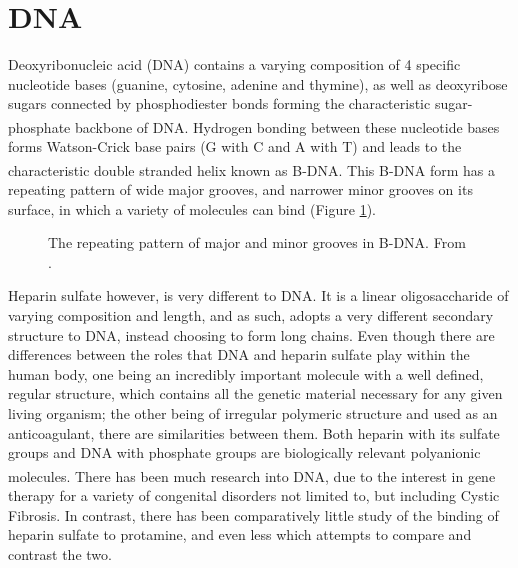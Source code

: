 \section{DNA}
Deoxyribonucleic acid (DNA) contains a varying composition of 4 specific nucleotide bases (guanine, cytosine, adenine and thymine), as well as deoxyribose sugars connected by phosphodiester bonds forming the characteristic sugar-phosphate backbone of DNA.\textsuperscript{\cite{Hamilton2012NaturalBinders}} Hydrogen bonding between these nucleotide bases forms Watson-Crick base pairs (G with C and A with T) and leads to the characteristic double stranded helix known as B-DNA.\textsuperscript{\cite{Voet2011Chapter5}} This B-DNA form has a repeating pattern of wide major grooves, and narrower minor grooves on its surface, in which a variety of molecules can bind (Figure \ref{B-DNA_structure}). 
\begin{figure} [ht!]
\caption{The repeating pattern of major and minor grooves in B-DNA. From \cite{Nelson1987TheImplications}.}
\label{B-DNA_structure}
\end{figure}
\newline
Heparin sulfate however, is very different to DNA. It is a linear oligosaccharide of varying composition and length, and as such, adopts a very different secondary structure to DNA, instead choosing to form long chains.
Even though there are differences between the roles that DNA and heparin sulfate play within the human body, one being an incredibly important molecule with a well defined, regular structure, which contains all the genetic material necessary for any given living organism; the other being of irregular polymeric structure and used as an anticoagulant, there are similarities between them. Both heparin with its sulfate groups and DNA with phosphate groups are biologically relevant polyanionic molecules.\textsuperscript{\cite{Mulloy2015PharmacologyDrugs}}
\newline
There has been much research into DNA, due to the interest in gene therapy for a variety of congenital disorders not limited to, but including Cystic Fibrosis.
In contrast, there has been comparatively little study of the binding of heparin sulfate to protamine, and even less which attempts to compare and contrast the two.  
